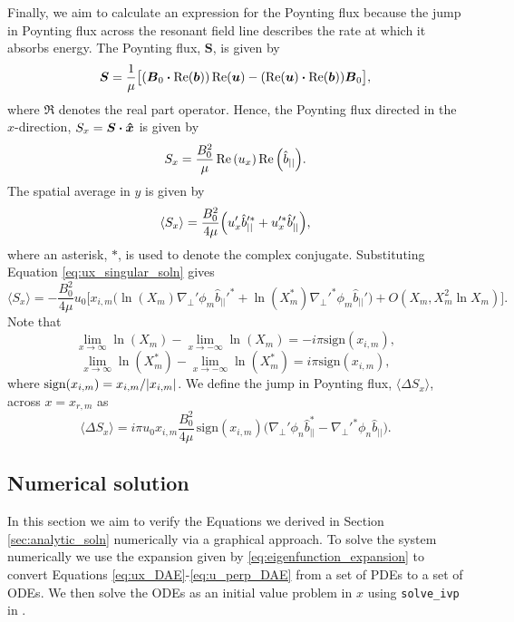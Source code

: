 \documentclass[linenumbers]{aastex63}
\let\vec\boldsymbol
\begin{document}
Finally, we aim to calculate an expression for the Poynting flux because the jump in Poynting flux across the resonant field line describes the rate at which it absorbs energy. The Poynting flux, $\vec{S}$, is given by
\begin{equation}
    \vec{S} = \frac{1}{\mu}\big[(\vec{B}_0\vdot\Re(\vec{b}))\Re(\vec{u}) - (\Re(\vec{u})\vdot\Re(\vec{b}))\vec{B}_0\big],
\end{equation}
where $\Re$ denotes the real part operator.
Hence, the Poynting flux directed in the $x$-direction, $S_x=\vec{S}\vdot\vec{\hat{x}}$ is given by
\begin{equation}
    S_x = \frac{B_0^2}{\mu}\Re\qty(u_x)\Re\qty(\hat{b}_{||}).
\end{equation}
The spatial average in $y$ is given by
\begin{equation}
    \langle S_x \rangle = \frac{B_0^2}{4\mu}\qty(u_x'\hat{b}_{||}'^* + u_x'^*\hat{b}_{||}'),
\end{equation}
where an asterisk, $*$, is used to denote the complex conjugate.
Substituting Equation \eqref{eq:ux_singular_soln} gives
\begin{equation}
    \label{eq:poy_flux_approx}
    \langle S_x \rangle = -\frac{B_0^2}{4\mu}u_0\Big[x_{i,m}\Big(\ln(X_m)\nabla_\perp'\phi_m \hat{b}_{||}'^* + \ln(X_m^*)\nabla_\perp'^*\phi_m\hat{b}_{||}'\Big) + O(X_m, X_m^2\ln X_m)\Big].
\end{equation}
Note that
\[\lim_{x\rightarrow \infty} \ln(X_m) - \lim_{x\rightarrow -\infty} \ln(X_m) = -i\pi\text{sign}(x_{i,m}),\]
\[\lim_{x\rightarrow \infty} \ln(X_m^*) - \lim_{x\rightarrow -\infty} \ln(X_m^*) = i\pi\text{sign}(x_{i,m}),\]
where $\text{sign}(x_{i,m})=x_{i,m}/\abs{x_{i,m}}$.
We define the jump in Poynting flux, $\langle \Delta S_x \rangle$, across $x=x_{r,m}$ as
\begin{equation}
\label{eq:poy_flux_jump}
    \langle \Delta S_x \rangle = i\pi u_0x_{i,m}\frac{B_0^2}{4\mu}\, \text{sign}(x_{i,m})\Big(\nabla_\perp'\phi_n \hat{b}_{||}^* - \nabla_\perp'^*\phi_n \hat{b}_{||}\Big).
\end{equation}

\subsection{Numerical solution}
\label{sec:numerical_solution}

In this section we aim to verify the Equations we derived in Section \ref{sec:analytic_soln} numerically via a graphical approach. To solve the system numerically we use the expansion given by
\eqref{eq:eigenfunction_expansion} to convert Equations \eqref{eq:ux_DAE}-\eqref{eq:u_perp_DAE} from a set of PDEs to a set of ODEs. We then solve the ODEs as an initial value problem in $x$ using \texttt{solve\_ivp} in \citet{Scipy2020}.
\end{document}
